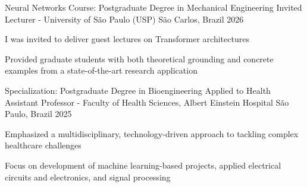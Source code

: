 

\begin{cventries}
\vspace{-10pt} 

  \cventry
    {Neural Networks Course: Postgraduate Degree in Mechanical Engineering} %
    {Invited Lecturer - University of São Paulo (USP)} %
    {São Carlos, Brazil} %
    {2026} %
    { \begin{cvitems} %
        \item {I was invited to deliver guest lectures on Transformer architectures}
        \item {Provided graduate students with both theoretical grounding and concrete examples from a state-of-the-art research application}
      \end{cvitems}}
\vspace{-5pt} 



  \cventry
    {Specialization: Postgraduate Degree in Bioengineering Applied to Health} %
    {Assistant Professor - Faculty of Health Sciences, Albert Einstein Hospital} %
    {São Paulo, Brazil} %
    {2025} %
    { \begin{cvitems} %
        \item {Emphasized a multidisciplinary, technology-driven approach to tackling complex healthcare challenges}
        \item {Focus on development of machine learning-based projects, applied electrical circuits and electronics, and signal processing}
      \end{cvitems}}
\vspace{-10pt} 


\end{cventries}
